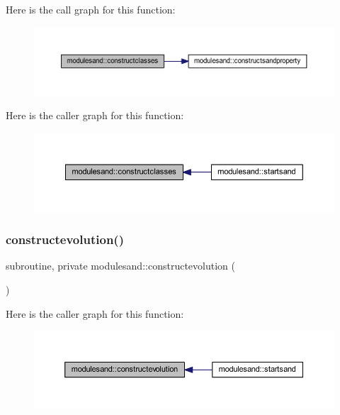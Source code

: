 Here is the call graph for this function\+:\nopagebreak
\begin{figure}[H]
\begin{center}
\leavevmode
\includegraphics[width=350pt]{namespacemodulesand_a83a39e6e7dea7526131ca5a256383f63_cgraph}
\end{center}
\end{figure}
Here is the caller graph for this function\+:\nopagebreak
\begin{figure}[H]
\begin{center}
\leavevmode
\includegraphics[width=350pt]{namespacemodulesand_a83a39e6e7dea7526131ca5a256383f63_icgraph}
\end{center}
\end{figure}
\mbox{\label{namespacemodulesand_a82762171a1b3adfea24df5d01e91490e}} 
\subsubsection{\texorpdfstring{constructevolution()}{constructevolution()}}
{\footnotesize\ttfamily subroutine, private modulesand\+::constructevolution (\begin{DoxyParamCaption}{ }\end{DoxyParamCaption})\hspace{0.3cm}{\ttfamily [private]}}

Here is the caller graph for this function\+:\nopagebreak
\begin{figure}[H]
\begin{center}
\leavevmode
\includegraphics[width=350pt]{namespacemodulesand_a82762171a1b3adfea24df5d01e91490e_icgraph}
\end{center}
\end{figure}
\mbox{\label{namespacemodulesand_a3f94338f096f34936302bce0d7d91189}} 
